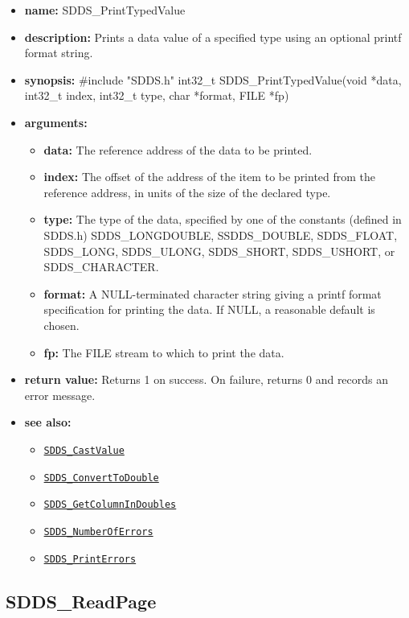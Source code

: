 \documentclass[11pt]{article}
\newcommand{\progref}[1]{\hyperref[SDDS_#1]{\tt SDDS\_#1}}
\begin{document}
\begin{itemize}
\item {\bf name:}\newline
SDDS\_PrintTypedValue
\item {\bf description:}\newline
Prints a data value of a specified type using an optional  printf format string.
\item {\bf synopsis:} \#include "SDDS.h"\newline
int32\_t SDDS\_PrintTypedValue(void *data, int32\_t index, int32\_t type, char *format, FILE *fp)
\item {\bf arguments:}
\begin{itemize}
\item {\bf data:} The reference address of the data to be printed.
\item {\bf index:} The offset of the address of the item to be printed from the reference address, in units of the size of the declared type.
\item {\bf type:} The type of the data, specified by one of the constants (defined in SDDS.h) SDDS\_LONGDOUBLE, SSDDS\_DOUBLE, SDDS\_FLOAT, SDDS\_LONG, SDDS\_ULONG, SDDS\_SHORT, SDDS\_USHORT, or SDDS\_CHARACTER.
\item {\bf format:} A NULL-terminated character string giving a  printf format specification for printing the data. If NULL, a reasonable default is chosen.
\item {\bf fp:} The FILE stream to which to print the data.
\end{itemize}
\item {\bf return value:}\newline
Returns 1 on success. On failure, returns 0 and records an error message.
\item {\bf see also:}
\begin{itemize}
\item \progref{CastValue}
\item \progref{ConvertToDouble}
\item \progref{GetColumnInDoubles}
\item \progref{NumberOfErrors}
\item \progref{PrintErrors}
\end{itemize}
\end{itemize}

\subsection{SDDS\_ReadPage}
\label{SDDS_ReadPage}
\end{document}
